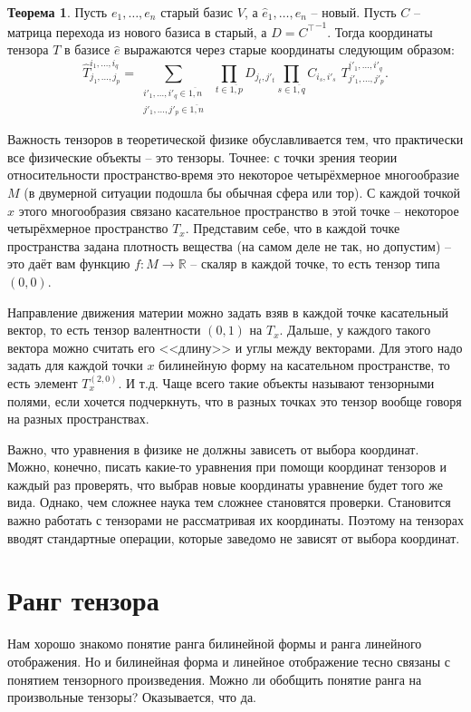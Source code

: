 \documentclass[10pt,a4paper,oneside]{book}
\theoremstyle{definition}
\newtheorem{thm}{\color{red!40!black}Теорема}
\newcommand{\mb}[1]{\mathbb{#1}}
\newcommand{\ovl}{\overline}
\def\thrm{\begin{thm}}
\def\ethrm{\end{thm}}
\begin{document}
\thrm Пусть $e_1,\dots,e_n$ старый базис $V$, а $\hat{e}_1,\dots,\hat{e}_n$ -- новый. Пусть $C$ -- матрица перехода из нового базиса в старый, а $D={C^{\top}}^{-1}$. Тогда координаты тензора $T$ в базисе $\hat{e}$ выражаются через старые координаты следующим образом:
$$\hat{T}_{j_1,\dots,j_p}^{i_1,\dots,i_q}=\sum_{\substack{i'_1,\dots,i'_q \in \ovl{1,n}\\ j'_1,\dots,j'_p \in \ovl{1,n}}} \,\,
\prod_{t\in \ovl{1,p}} D_{j_t,j'_t} \prod_{s\in \ovl{1,q}} C_{i_s,i'_s}  \,\,T_{j'_1,\dots,j'_p}^{i'_1,\dots,i'_q}.$$
\ethrm

Важность тензоров в теоретической физике обуславливается тем, что практически все физические объекты -- это тензоры. Точнее: с точки зрения теории относительности пространство-время это некоторое четырёхмерное многообразие $M$ (в двумерной ситуации подошла бы обычная сфера или тор). С каждой точкой $x$ этого многообразия связано касательное пространство в этой точке -- некоторое четырёхмерное пространство $T_x$. Представим себе, что в каждой точке пространства задана плотность вещества (на самом деле не так, но допустим) -- это даёт вам функцию $f \colon M \to \mb R$ -- скаляр в каждой точке, то есть тензор типа $(0,0)$. 

Направление движения материи можно задать взяв в каждой точке касательный вектор, то есть тензор валентности $(0,1)$ на $T_x$. Дальше, у каждого такого вектора можно считать его <<длину>> и углы между векторами. Для этого надо задать для каждой точки $x$ билинейную форму на касательном пространстве, то есть элемент $T_x^{(2,0)}$. И т.д. Чаще всего такие объекты называют тензорными полями, если хочется подчеркнуть, что в разных точках это тензор вообще говоря на разных пространствах.

Важно, что уравнения в физике не должны зависеть от выбора координат. Можно, конечно, писать какие-то уравнения при помощи координат тензоров и каждый раз проверять, что выбрав новые координаты уравнение будет того же вида. Однако, чем сложнее наука тем сложнее становятся проверки. Становится важно работать с тензорами не рассматривая их координаты. Поэтому на тензорах вводят стандартные операции, которые заведомо не зависят от выбора координат.


\section{Ранг тензора}

Нам хорошо знакомо понятие ранга билинейной формы и ранга линейного отображения. Но и билинейная форма и линейное отображение тесно связаны с понятием тензорного произведения. Можно ли обобщить понятие ранга на произвольные тензоры? Оказывается, что да. 
\end{document}
